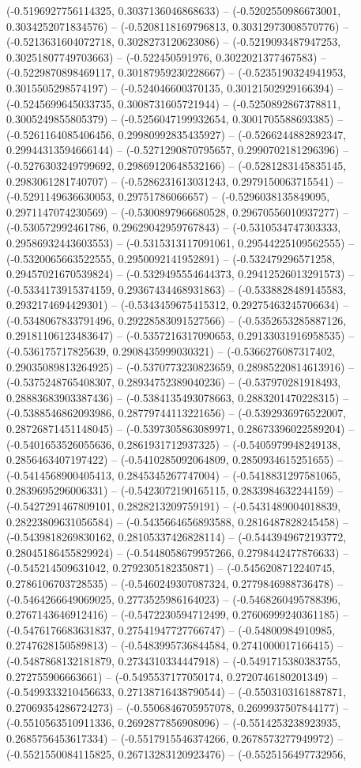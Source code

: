 (-0.5196927756114325, 0.3037136046868633) -- (-0.5202550986673001, 0.3034252071834576) -- (-0.5208118169796813, 0.30312973008570776) -- (-0.5213631604072718, 0.3028273120623086) -- (-0.5219093487947253, 0.30251807749703663) -- (-0.522450591976, 0.3022021377467583) -- (-0.5229870898469117, 0.30187959230228667) -- (-0.5235190324941953, 0.3015505298574197) -- (-0.524046600370135, 0.30121502929166394) -- (-0.5245699645033735, 0.3008731605721944) -- (-0.5250892867378811, 0.3005249855805379) -- (-0.5256047199932654, 0.3001705588693385) -- (-0.5261164085406456, 0.29980992835435927) -- (-0.5266244882892347, 0.29944313594666144) -- (-0.5271290870795657, 0.2990702181296396) -- (-0.5276303249799692, 0.29869120648532166) -- (-0.5281283145835145, 0.2983061281740707) -- (-0.5286231613031243, 0.2979150063715541) -- (-0.5291149636630053, 0.29751786066657) -- (-0.5296038135849095, 0.2971147074230569) -- (-0.5300897966680528, 0.29670556010937277) -- (-0.530572992461786, 0.29629042959767843) -- (-0.5310534747303333, 0.29586932443603553) -- (-0.5315313117091061, 0.29544225109562555) -- (-0.5320065663522555, 0.2950092141952891) -- (-0.532479296571258, 0.29457021670539824) -- (-0.5329495554644373, 0.29412526013291573) -- (-0.5334173915374159, 0.29367434468931863) -- (-0.5338828489145583, 0.2932174694429301) -- (-0.5343459675415312, 0.29275463245706634) -- (-0.5348067833791496, 0.29228583091527566) -- (-0.5352653285887126, 0.29181106123483647) -- (-0.5357216317090653, 0.29133031916958535) -- (-0.536175717825639, 0.2908435999030321) -- (-0.5366276087317402, 0.29035089813264925) -- (-0.5370773230823659, 0.28985220814613916) -- (-0.5375248765408307, 0.28934752389040236) -- (-0.537970281918493, 0.28883683903387436) -- (-0.5384135493078663, 0.2883201470228315) -- (-0.5388546862093986, 0.28779744113221656) -- (-0.5392936976522007, 0.28726871451148045) -- (-0.5397305863089971, 0.28673396022589204) -- (-0.5401653526055636, 0.2861931712937325) -- (-0.5405979948249138, 0.2856463407197422) -- (-0.5410285092064809, 0.2850934615251655) -- (-0.5414568900405413, 0.2845345267747004) -- (-0.5418831297581065, 0.2839695296006331) -- (-0.5423072190165115, 0.2833984632244159) -- (-0.5427291467809101, 0.2828213209759191) -- (-0.5431489004018839, 0.28223809631056584) -- (-0.5435664656893588, 0.2816487828245458) -- (-0.5439818269830162, 0.28105337426828114) -- (-0.5443949672193772, 0.28045186455829924) -- (-0.5448058679957266, 0.2798442477876633) -- (-0.545214509631042, 0.2792305182350871) -- (-0.5456208712240745, 0.2786106703728535) -- (-0.5460249307087324, 0.2779846988736478) -- (-0.5464266649069025, 0.2773525986164023) -- (-0.5468260495788396, 0.2767143646912416) -- (-0.5472230594712499, 0.27606999240361185) -- (-0.5476176683631837, 0.27541947727766747) -- (-0.54800984910985, 0.2747628150589813) -- (-0.5483995736844584, 0.2741000017166415) -- (-0.5487868132181879, 0.2734310334447918) -- (-0.5491715380383755, 0.272755906663661) -- (-0.5495537177050174, 0.2720746180201349) -- (-0.5499333210456633, 0.27138716438790544) -- (-0.5503103161887871, 0.27069354286724273) -- (-0.5506846705957078, 0.2699937507844177) -- (-0.5510563510911336, 0.2692877856908096) -- (-0.5514253238923935, 0.2685756453617334) -- (-0.5517915546374266, 0.2678573277949972) -- (-0.5521550084115825, 0.26713283120923476) -- (-0.5525156497732956, 